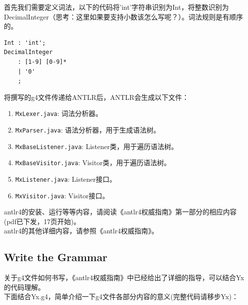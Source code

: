 首先我们需要定义词法，以下的代码将'int'字符串识别为Int，将整数识别为DecimalInteger（思考：这里如果要支持小数该怎么写呢？）。词法规则是有顺序的。
\begin{lstlisting}
Int : 'int';
DecimalInteger
    : [1-9] [0-9]*
    | '0'
    ;
\end{lstlisting}



将撰写的g4文件传递给ANTLR后，ANTLR会生成以下文件：
\begin{enumerate}
    \item \texttt{MxLexer.java}: 词法分析器。
    \item \texttt{MxParser.java}: 语法分析器，用于生成语法树。
    \item \texttt{MxBaseListener.java}: Listener类，用于遍历语法树。
    \item \texttt{MxBaseVisitor.java}: Visitor类，用于遍历语法树。
    \item \texttt{MxListener.java}: Listener接口。
    \item \texttt{MxVisitor.java}: Visitor接口。
\end{enumerate}


antlr4的安装、运行等等内容，请阅读《antlr4权威指南》第一部分的相应内容(pdf已下发，17页开始)。\\

antlr4的其他详细内容，请参照《antlr4权威指南》。

\subsection{Write the Grammar}
关于g4文件如何书写，《antlr4权威指南》中已经给出了详细的指导，可以结合Yx的代码理解。\\

下面结合Yx.g4，简单介绍一下g4文件各部分内容的意义(完整代码请移步Yx)：\\

